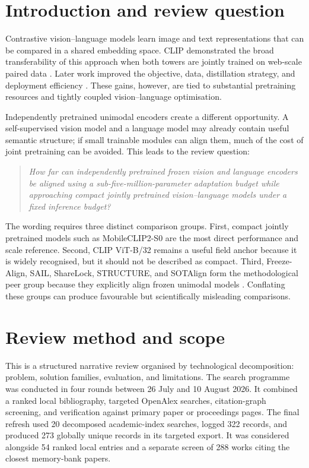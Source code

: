 \documentclass[11pt,a4paper,oneside]{report}
\begin{document}
\section{Introduction and review question}

Contrastive vision--language models learn image and text representations that
can be compared in a shared embedding space. CLIP demonstrated the broad
transferability of this approach when both towers are jointly trained on
web-scale paired data \cite{radford2021clip}. Later work improved the objective,
data, distillation strategy, and deployment efficiency
\cite{zhai2023siglip,vasu2024mobileclip,faghri2025mobileclip2}. These gains,
however, are tied to substantial pretraining resources and tightly coupled
vision--language optimisation.

Independently pretrained unimodal encoders create a different opportunity. A
self-supervised vision model and a language model may already contain useful
semantic structure; if small trainable modules can align them, much of the cost
of joint pretraining can be avoided. This leads to the review question:

\begin{quote}
\emph{How far can independently pretrained frozen vision and language encoders
be aligned using a sub-five-million-parameter adaptation budget while
approaching compact jointly pretrained vision--language models under a fixed
inference budget?}
\end{quote}

The wording requires three distinct comparison groups. First, compact jointly
pretrained models such as MobileCLIP2-S0 are the most direct performance and
scale reference. Second, CLIP ViT-B/32 remains a useful field anchor because it
is widely recognised, but it should not be described as compact. Third,
Freeze-Align, SAIL, ShareLock, STRUCTURE, and SOTAlign form the methodological
peer group because they explicitly align frozen unimodal models
\cite{maniparambil2025freezealign,zhang2025sail,ruthardt2026sharelock,groger2025structure,roschmann2026sotalign}.
Conflating these groups can produce favourable but scientifically misleading
comparisons.

\section{Review method and scope}

This is a structured narrative review organised by technological decomposition:
problem, solution families, evaluation, and limitations. The search programme
was conducted in four rounds between 26 July and 10 August 2026. It combined a
ranked local bibliography, targeted OpenAlex searches, citation-graph screening,
and verification against primary paper or proceedings pages. The final refresh
used 20 decomposed academic-index searches, logged 322 records, and produced 273
globally unique records in its targeted export. It was considered alongside 54
ranked local entries and a separate screen of 288 works citing the closest
memory-bank papers.
\end{document}
